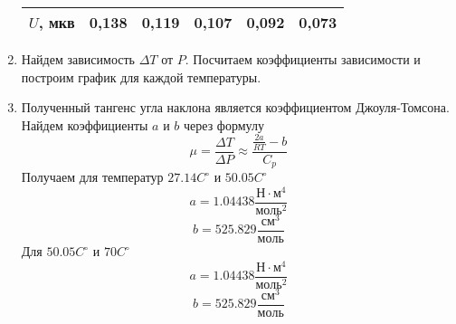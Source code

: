 \documentclass[12pt]{article}
\begin{document}
\begin{enumerate}
\begin{center}
\begin{tabular}{|c|c|c|c|c|c|}
    		$U$, мкв & 0,138 & 0,119 & 0,107 & 0,092 & 0,073 \\ 
    \hline 
    \end{tabular}
    \end{center}
    \begin{center}
    \end{center}
 	\item Найдем зависимость $\Delta T$ от $P$. Посчитаем коэффициенты зависимости и построим график для каждой температуры.
 	\item Полученный тангенс угла наклона является коэффициентом Джоуля-Томсона. Найдем коэффициенты $a$ и $b$ через формулу
 	\begin{equation}
 	\mu = \frac{\Delta T}{\Delta P} \approx \frac{\frac{2a}{RT}-b}{C_p}
 	\end{equation}
 	Получаем для температур $27.14C^\circ$ и $50.05C^\circ$
 	\begin{equation*}
 	a = 1.04438\frac{Н\cdot м^4}{моль^2}
 	\end{equation*}
 	\begin{equation*}
 	b = 525.829 \frac{см^3}{моль}
 	\end{equation*}
 	Для $50.05C^\circ$ и $70C^\circ$
 	\begin{equation*}
 	a = 1.04438\frac{Н\cdot м^4}{моль^2}
 	\end{equation*}
 	\begin{equation*}
 	b = 525.829 \frac{см^3}{моль}
 	\end{equation*}
\end{enumerate}
\end{document}
